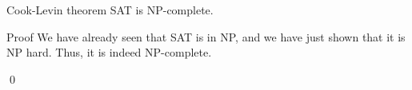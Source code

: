 \documentclass[a4paper]{article}
\begin{document}
\begin{parag}{Cook-Levin theorem}
    SAT is NP-complete.

    \begin{subparag}{Proof}
        We have already seen that SAT is in NP, and we have just shown that it is NP hard. Thus, it is indeed NP-complete. \smiley

        \qed
    \end{subparag}
\end{parag}
\end{document}
